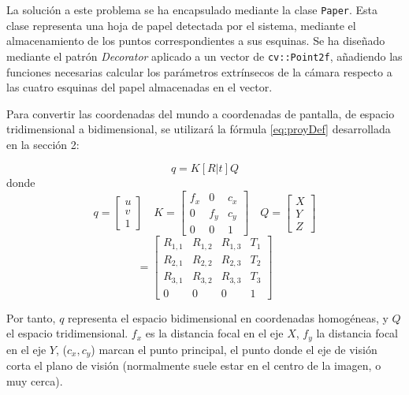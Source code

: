 La solución a este problema se ha encapsulado mediante la clase \texttt{Paper}. Esta clase representa una hoja de papel detectada por el sistema, mediante el almacenamiento de los puntos correspondientes a sus esquinas. Se ha diseñado mediante el patrón \textit{Decorator} aplicado a un vector de \texttt{cv::Point2f}, añadiendo las funciones necesarias calcular los parámetros extrínsecos de la cámara respecto a las cuatro esquinas del papel almacenadas en el vector.

Para convertir las coordenadas del mundo a coordenadas de pantalla, de espacio tridimensional a bidimensional, se utilizará la fórmula \ref{eq:proyDef} desarrollada en la sección 2:

\begin{equation}
  q=K[R|t]Q
\end{equation}
donde
\begin{equation}
  q=\begin{bmatrix} u \\ v \\ 1 \end{bmatrix} \quad K=\begin{bmatrix} f_{x} & 0 & c_{x} \\ 0 & f_{y} & c_{y} \\ 0 & 0 & 1 \end{bmatrix} \quad Q=\begin{bmatrix} X \\ Y \\ Z \end{bmatrix}
\end{equation}
\begin{equation}
  [R|t] = \begin{bmatrix} R_{1,1} & R_{1,2} & R_{1,3} & T_{1}  \\
    R_{2,1} & R_{2,2} & R_{2,3} & T_{2}  \\
    R_{3,1} & R_{3,2} & R_{3,3} & T_{3}  \\
    0    &     0    &     0    &  1
  \end{bmatrix}
\end{equation}

Por tanto, $q$ representa el espacio bidimensional en coordenadas homogéneas, y $Q$ el espacio tridimensional. $f_{x}$ es la distancia focal en el eje $X$, $f_{y}$ la distancia focal en el eje $Y$, ($c_{x},c_{y}$) marcan el punto principal, el punto donde el eje de visión corta el plano de visión (normalmente suele estar en el centro de la imagen, o muy cerca). 

